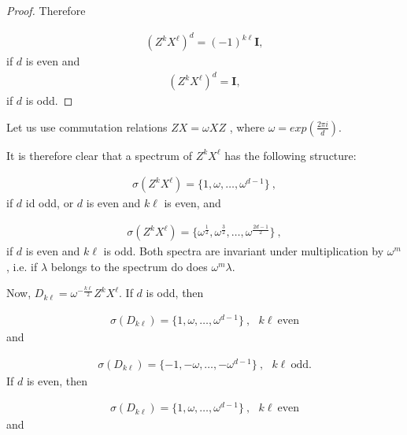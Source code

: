 \documentclass[12pt]{amsart}
\numberwithin{equation}{section}
\begin{document}
\begin{proof}
Therefore 


\begin{eqnarray*}
    (Z^k X^\ell)^d = (-1)^{k \ell} \mathbf{I} ,
\end{eqnarray*} if $d$ is even
and 
\begin{eqnarray*}
    (Z^k X^\ell)^d = \mathbf{I} ,
\end{eqnarray*}
if $d$ is odd.

       


\end{proof}





   
   
   \iffalse
   
   Let us use commutation relations $ZX=\omega XZ$ , where $\omega=exp \left( \frac{2 \pi i}{d}\right)$.

\vspace{.3cm}

It is therefore clear that a spectrum of  $Z^k X^\ell$ has the following structure:

\begin{eqnarray*}
    \sigma(Z^k X^\ell) = \{1,\omega,\ldots,\omega^{d-1} \}   \ , 
\end{eqnarray*}
if $d$ id odd, or $d$ is even and $k \ell$ is even, and

\begin{eqnarray*}
    \sigma(Z^k X^\ell) = \{\omega^{\frac 12},\omega^{\frac 32},\ldots,\omega^\frac{2d-1}{2} \}   \ , 
\end{eqnarray*}
if $d$ is even and $k \ell$ is odd. Both spectra are invariant under multiplication by $\omega^m$, i.e. if $\lambda$ belongs to the spectrum do does $\omega^m \lambda$. 


Now, $D_{k\ell} = \omega^{-\frac{k\ell}{2}} Z^k X^\ell$. If $d$ is odd, then 

\begin{eqnarray*}
    \sigma(D_{k\ell}) = \{1,\omega,\ldots,\omega^{d-1} \} \ , \ \ \ k\ell\ \mbox{even}
\end{eqnarray*}
and

\begin{eqnarray*}
    \sigma(D_{k\ell}) = \{-1,-\omega,\ldots,-\omega^{d-1} \} \ , \ \ \ k\ell\ \mbox{odd} .
\end{eqnarray*}
 If $d$ is even, then 


\begin{eqnarray*}
    \sigma(D_{k\ell}) = \{1,\omega,\ldots,\omega^{d-1} \} \ , \ \ \ k\ell\ \mbox{even}
\end{eqnarray*}
and
\end{document}
